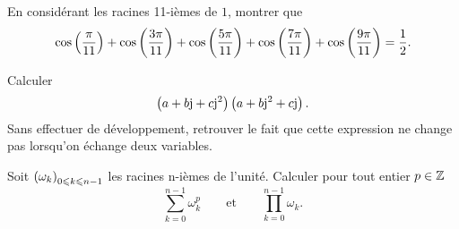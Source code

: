 \documentclass{magnolia}
\begin{document}
En considérant les racines 11-ièmes de $1$, montrer que
  $$\cos\left(\frac{\pi}{11}\right)+\cos\left(\frac{3\pi}{11}\right)+\cos\left(\frac{5\pi}{11}\right)+
    \cos\left(\frac{7\pi}{11}\right)+\cos\left(\frac{9\pi}{11}\right)=\frac{1}{2}.$$

  \begin{questions}
  \question Calculer
    $$\left(a+b{\rm j}+c{\rm j}^2\right)\left(a+b{\rm j}^2+c{\rm j}\right).$$
  \question Sans effectuer de développement, retrouver le fait que cette
    expression ne change pas lorsqu'on échange deux variables.
  \end{questions}

Soit $\left(\omega_k\right)_{0\leqslant k\leqslant n-1}$ les racines n-ièmes de l'unité.
  Calculer pour tout entier $p\in\mathbb{Z}$
  $$\sum_{k=0}^{n-1} \omega_k^p \qquad \text{et} \qquad
    \prod_{k=0}^{n-1} \omega_k.$$
\end{document}
